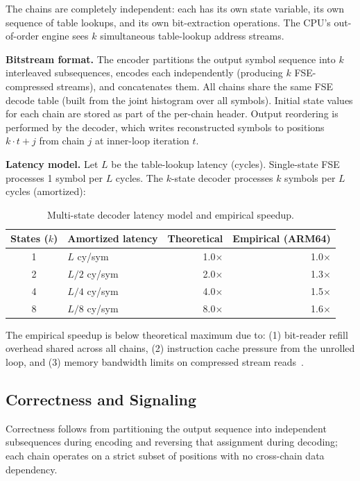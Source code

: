 \documentclass[journal]{IEEEtran}
\begin{document}
The chains are completely independent: each has its own state variable,
its own sequence of table lookups, and its own bit-extraction operations.
The CPU's out-of-order engine sees $k$ simultaneous table-lookup address
streams.

\textbf{Bitstream format.} The encoder partitions the output symbol
sequence into $k$ interleaved subsequences, encodes each independently
(producing $k$ FSE-compressed streams), and concatenates them. All chains
share the same FSE decode table (built from the joint histogram over all
symbols). Initial state values for each chain are stored as part of the
per-chain header. Output reordering is performed by the decoder, which
writes reconstructed symbols to positions $k\cdot t + j$ from chain $j$
at inner-loop iteration $t$.

\textbf{Latency model.} Let $L$ be the table-lookup latency (cycles).
Single-state FSE processes 1 symbol per $L$ cycles. The $k$-state decoder
processes $k$ symbols per $L$ cycles (amortized):

\begin{table}[htbp]
\centering
\caption{Multi-state decoder latency model and empirical speedup.}
\label{tab:latency}
\begin{tabular}{clrr}
\toprule
States ($k$) & Amortized latency & Theoretical & Empirical (ARM64) \\
\midrule
1 & $L$ cy/sym & 1.0$\times$ & 1.0$\times$ \\
2 & $L/2$ cy/sym & 2.0$\times$ & 1.3$\times$ \\
4 & $L/4$ cy/sym & 4.0$\times$ & 1.5$\times$ \\
8 & $L/8$ cy/sym & 8.0$\times$ & 1.6$\times$ \\
\bottomrule
\end{tabular}
\end{table}

The empirical speedup is below theoretical maximum due to: (1) bit-reader
refill overhead shared across all chains, (2) instruction cache pressure from
the unrolled loop, and (3) memory bandwidth limits on compressed stream
reads~\cite{williams2009}.

\subsection{Correctness and Signaling}
\label{sec:signaling}

Correctness follows from partitioning the output sequence into independent
subsequences during encoding and reversing that assignment during decoding;
each chain operates on a strict subset of positions with no cross-chain data
dependency.
\end{document}
